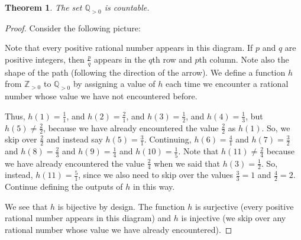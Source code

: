 \documentclass{book}
\newcounter{ekcounter}%
\theoremstyle{ekimcustom}
\newtheorem{theorem}[ekcounter]{Theorem}
\begin{document}
\begin{theorem}
The set $\mathbb{Q}_{>0}$ is countable.
\end{theorem}
\begin{proof}
Consider the following picture:
\begin{center}
\end{center}
Note that every positive rational number appears in this diagram. If $p$ and $q$ are positive integers, then $\frac{p}{q}$ appears in the $q$th row and $p$th column. Note also the shape of the path (following the direction of the arrow). We define a function $h$ from $\mathbb{Z}_{>0}$ to $\mathbb{Q}_{>0}$ by assigning a value of $h$ each time we encounter a rational number whose value we have not encountered before.

Thus, $h(1)=\frac11$, and $h(2)=\frac21$, and $h(3)=\frac12$, and $h(4)=\frac13$, but $h(5)\not=\frac22$, because we have already encountered the value $\frac22$ as $h(1)$. So, we skip over $\frac22$ and instead say $h(5)=\frac31$. Continuing, $h(6)=\frac41$ and $h(7)=\frac32$ and $h(8)=\frac23$ and $h(9)=\frac14$ and $h(10)=\frac15$. Note that $h(11)\not=\frac24$ because we have already encountered the value $\frac24$ when we said that $h(3)=\frac12$. So, instead, $h(11)=\frac51$, since we also need to skip over the values $\frac33=1$ and $\frac42=2$. Continue defining the outputs of $h$ in this way.

We see that $h$ is bijective by design. The function $h$ is surjective (every positive rational number appears in this diagram) and $h$ is injective (we skip over any rational number whose value we have already encountered).
\end{proof}
\end{document}
